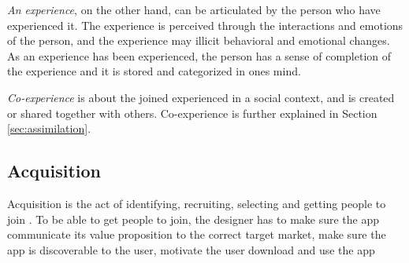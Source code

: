 \textit{An experience}, on the other hand, can be articulated by the person who have experienced it. The experience is perceived through the interactions and emotions of the person, and the experience may illicit behavioral and emotional changes. As an experience has been experienced, the person has a sense of completion of the experience and it is stored and categorized in ones mind.

\textit{Co-experience} is about the joined experienced in a social context, and is created or shared together with others. Co-experience is further explained in Section \ref{sec:assimilation}.

\subsection{Acquisition}
Acquisition is the act of identifying, recruiting, selecting and getting people to join \cite{Bradt2009}. To be able to get people to join, the designer has to make sure the app communicate its value proposition to the correct target market, make sure the app is discoverable to the user, motivate the user download and use the app

